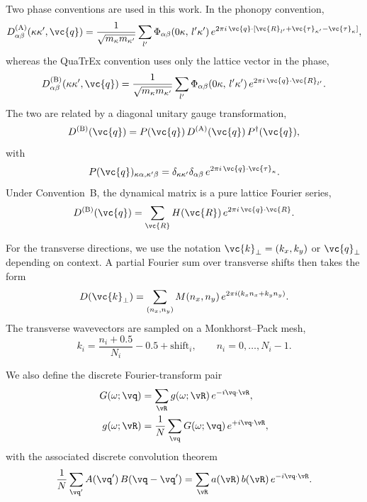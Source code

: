 Two phase conventions are used in this work.  In the phonopy
convention,
\begin{equation}\label{eq:DA_conv}
  D_{\alpha\beta}^{(\mathrm{A})}(\kappa\kappa',\vc{q})
  = \frac{1}{\sqrt{m_\kappa m_{\kappa'}}}
    \sum_{l'} \Phi_{\alpha\beta}(0\kappa,\,l'\kappa')\,
    e^{2\pi i\,\vc{q}\cdot
      [\vc{R}_{l'} + \vc{\tau}_{\kappa'} - \vc{\tau}_\kappa]},
\end{equation}
whereas the QuaTrEx convention uses only the lattice vector in the
phase,
\begin{equation}\label{eq:DB_conv}
  D_{\alpha\beta}^{(\mathrm{B})}(\kappa\kappa',\vc{q})
  = \frac{1}{\sqrt{m_\kappa m_{\kappa'}}}
    \sum_{l'} \Phi_{\alpha\beta}(0\kappa,\,l'\kappa')\,
    e^{2\pi i\,\vc{q}\cdot\vc{R}_{l'}}.
\end{equation}
The two are related by a diagonal unitary gauge transformation,
\begin{equation}\label{eq:gauge_conv}
  D^{(\mathrm{B})}(\vc{q})
  = P(\vc{q})\,D^{(\mathrm{A})}(\vc{q})\,P^\dagger(\vc{q}),
\end{equation}
with
\begin{equation}
  P(\vc{q})_{\kappa\alpha,\kappa'\beta}
  = \delta_{\kappa\kappa'}\delta_{\alpha\beta}\,
    e^{2\pi i\,\vc{q}\cdot\vc{\tau}_\kappa}.
\end{equation}
Under Convention~B, the dynamical matrix is a pure lattice Fourier
series,
\begin{equation}\label{eq:fourier_series_conv}
  D^{(\mathrm{B})}(\vc{q})
  = \sum_{\vc{R}} H(\vc{R})\,e^{2\pi i\,\vc{q}\cdot\vc{R}}.
\end{equation}

For the transverse directions, we use the notation
$\vc{k}_\perp = (k_x,k_y)$ or $\vc{q}_\perp$ depending on context.  A
partial Fourier sum over transverse shifts then takes the form
\begin{equation}
  D(\vc{k}_\perp)
  = \sum_{(n_x,n_y)} M(n_x,n_y)\,
    e^{2\pi i (k_x n_x + k_y n_y)}.
\end{equation}
The transverse wavevectors are sampled on a Monkhorst--Pack mesh,
\begin{equation}
  k_i = \frac{n_i + 0.5}{N_i} - 0.5 + \mathrm{shift}_i,
  \qquad n_i = 0,\ldots,N_i-1.
\end{equation}

We also define the discrete Fourier-transform pair
\begin{align}
  G(\omega;\vq) &= \sum_{\vR} g(\omega;\vR)\,e^{-i\vq\cdot\vR},
  \label{eq:dft_fwd} \\
  g(\omega;\vR) &= \frac{1}{N}\sum_{\vq} G(\omega;\vq)\,e^{+i\vq\cdot\vR},
  \label{eq:dft_inv}
\end{align}
with the associated discrete convolution theorem
\begin{equation}\label{eq:conv_theorem}
  \frac{1}{N}\sum_{\vq'} A(\vq')\,B(\vq-\vq')
  = \sum_{\vR} a(\vR)\,b(\vR)\,e^{-i\vq\cdot\vR}.
\end{equation}

